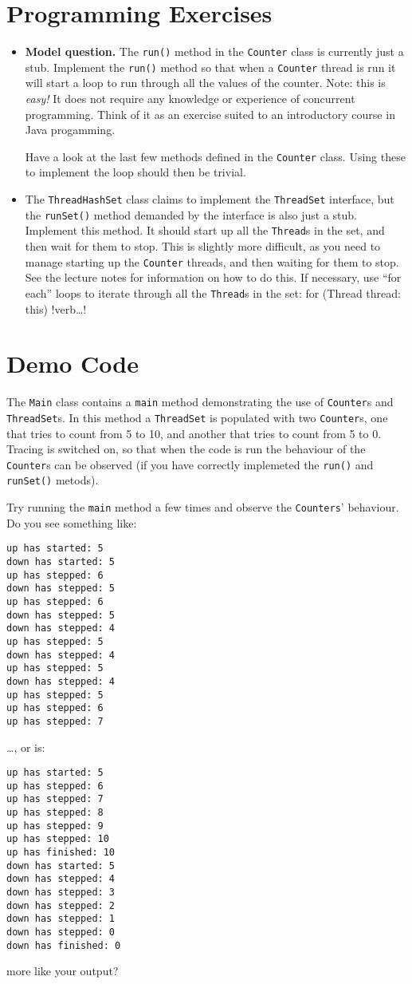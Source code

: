 \documentclass{article}
\begin{document}
\section{Programming Exercises}
\begin{itemize}
\item 
{\bf {} Model question.} 
The {\tt run()} method in the {\tt Counter} class is currently just a stub.
Implement the {\tt run()} method so that when a {\tt Counter}
thread is run it will start a  loop to run through all the 
values of the counter.  Note: this is {\em easy!} It does not require any
knowledge or experience of concurrent programming.  Think of it as an
exercise suited to an introductory course in Java progamming.

Have a look 
at the last few methods defined in the {\tt Counter} class.
Using these to implement the loop should then be trivial.
\item The {\tt ThreadHashSet} class claims to implement the {\tt ThreadSet}
interface, but the {\tt runSet()} method demanded by the
interface is also just a stub.  Implement this method.  It should 
start up all the {\tt Thread}s in the set, and then wait for them to 
stop.  This is slightly more difficult, as you need to manage
starting up the {\tt Counter} threads, and then waiting for
them to stop.  See the lecture notes for information on how
to do this.  If necessary, use ``for each'' loops to iterate through all
the {\tt Thread}s in the set:
for (Thread thread: this) {
  !verb\ldots!
}
\EndSystem
\end{itemize}
\section{Demo Code}
The {\tt Main} class contains a {\tt main} method demonstrating the use
of {\tt Counter}s and {\tt ThreadSet}s.  In this method a {\tt ThreadSet}
is populated with two {\tt Counter}s, one that tries to count from 5 to 10, and
another that tries to count from 5 to 0.  Tracing is switched on, so that
when the code is run the behaviour of the {\tt Counter}s can be 
observed (if you have correctly implemeted the {\tt run()} and 
{\tt runSet()} metods).

Try running the {\tt main} method a few times and observe the
{\tt Counters}' behaviour.
Do you see something like:
\begin{verbatim}
up has started: 5
down has started: 5
up has stepped: 6
down has stepped: 5
up has stepped: 6
down has stepped: 5
down has stepped: 4
up has stepped: 5
down has stepped: 4
up has stepped: 5
down has stepped: 4
up has stepped: 5
up has stepped: 6
up has stepped: 7
\end{verbatim}
\ldots, or is:
\begin{verbatim}
up has started: 5
up has stepped: 6
up has stepped: 7
up has stepped: 8
up has stepped: 9
up has stepped: 10
up has finished: 10
down has started: 5
down has stepped: 4
down has stepped: 3
down has stepped: 2
down has stepped: 1
down has stepped: 0
down has finished: 0
\end{verbatim}
more like your output?
\end{document}
